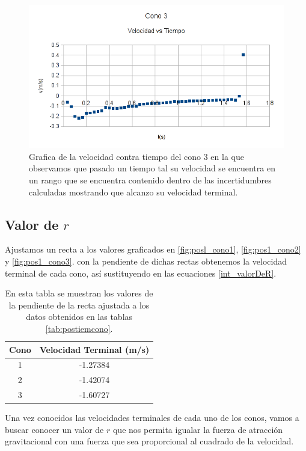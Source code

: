 \begin{figure}[h!]
    \centering
    \includegraphics{vel_cono3}
    \caption{Grafica de la velocidad contra tiempo del cono 3 en la que observamos que 
	pasado un tiempo tal su velocidad se encuentra en un rango que se encuentra contenido
	dentro de las incertidumbres calculadas mostrando que alcanzo su velocidad terminal.}
    \label{fig:VelCono3}
\end{figure}
\subsection{Valor de $r$}

Ajustamos un recta a los valores graficados en
\ref{fig:posl_cono1}, \ref{fig:pos1_cono2} y \ref{fig:pos1_cono3}.
con la pendiente de dichas rectas obtenemos la velocidad
terminal de cada cono, así sustituyendo en las ecuaciones
\ref{int_valorDeR}.

\begin{table}
    \centering
    \begin{tabular}{|c|c|}
        \hline
        \rowcolor{azulito} Cono & Velocidad Terminal (m/s) \\
        \hline 1 & -1.27384 \\
        \hline 2 & -1.42074 \\
        \hline 3 & -1.60727 \\
        \hline
    \end{tabular}
    \caption{En esta tabla se muestran los valores
    de la pendiente de la recta ajustada a los datos
    obtenidos en las tablas \ref{tab:postiemcono}.}
    \label{tab:VelTerminal}
\end{table}

Una vez conocidos las velocidades terminales de cada uno de los
conos, vamos a buscar conocer un valor de $r$ que nos permita
igualar la fuerza de atracción gravitacional con una fuerza que 
sea proporcional al cuadrado de la velocidad.

